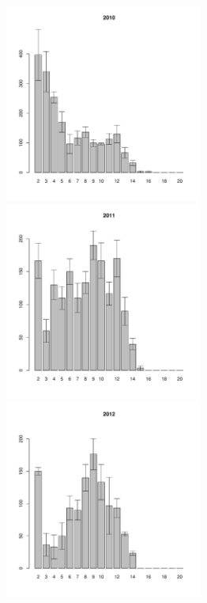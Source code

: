 \documentclass[12pt, a4paper]{article}
\begin{document}
\begin{figure}[h]

\begin{multicols}{3}
\hfill
\includegraphics[width=65mm]{../White_Sea/Estuatiy_Luvenga/sizestr2_2010_.pdf}
\hfill
\end{multicols}

\begin{multicols}{3}
\hfill
\includegraphics[width=65mm]{../White_Sea/Estuatiy_Luvenga/sizestr2_2011_.pdf}
\end{multicols}



\begin{multicols}{3}
\hfill
\includegraphics[width=65mm]{../White_Sea/Estuatiy_Luvenga/sizestr2_2012_.pdf}
\end{multicols}


\end{figure}
\end{document}
